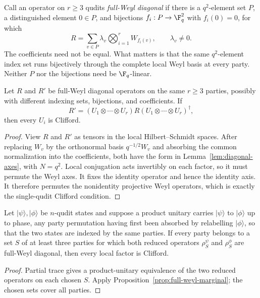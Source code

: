 \AMEFigureTwo

Call an operator on \(r\geq3\) qudits \emph{full-Weyl diagonal} if there
is a \(q^2\)-element set \(P\), a distinguished element \(0\in P\), and
bijections \(f_i:P\to\F_q^2\) with \(f_i(0)=0\), for which
\[
 R=\sum_{v\in P}\lambda_v
       \bigotimes_{i=1}^r W_{f_i(v)},\qquad \lambda_v\ne0.       \tag{3.2}
\]
The coefficients need not be equal.  What matters is that the same
\(q^2\)-element index set runs bijectively through the complete local
Weyl basis at every party.  Neither \(P\) nor the bijections need be
\(\F_q\)-linear.

\begin{proposition}
\label{prop:full-weyl-marginal}
Let \(R\) and \(R'\) be full-Weyl diagonal operators on the same
\(r\geq3\) parties, possibly with different indexing sets, bijections,
and coefficients.  If
\[
 R'=(U_1\otimes\cdots\otimes U_r)R
       (U_1\otimes\cdots\otimes U_r)^\dagger ,
\]
then every \(U_i\) is Clifford.
\end{proposition}

\begin{proof}
View \(R\) and \(R'\) as tensors in the local Hilbert--Schmidt spaces.
After replacing \(W_v\) by the orthonormal basis \(q^{-1/2}W_v\) and
absorbing the common normalization into the coefficients, both have the
form in Lemma~\ref{lem:diagonal-axes}, with \(N=q^2\).
Local conjugation acts invertibly on each factor, so it must permute the
Weyl axes.  It fixes the identity operator and hence the identity axis.
It therefore permutes the nonidentity projective Weyl operators, which
is exactly the single-qudit Clifford condition.
\end{proof}

\begin{corollary}
\label{cor:full-weyl-cover}
Let \(\lvert\psi\rangle,\lvert\phi\rangle\) be \(n\)-qudit states and
suppose a product unitary carries \(\lvert\psi\rangle\) to
\(\lvert\phi\rangle\) up to phase, any party permutation having first been
absorbed by relabelling \(\lvert\phi\rangle\), so that the two states are
indexed by the same parties.  If every
party belongs to a set \(S\) of at least three parties for which both
reduced operators \(\rho^\psi_S\) and \(\rho^\phi_S\) are full-Weyl
diagonal, then every local factor is Clifford.
\end{corollary}

\begin{proof}
Partial trace gives a product-unitary equivalence of the two reduced
operators on each chosen \(S\).  Apply
Proposition~\ref{prop:full-weyl-marginal}; the chosen sets cover all
parties.
\end{proof}

